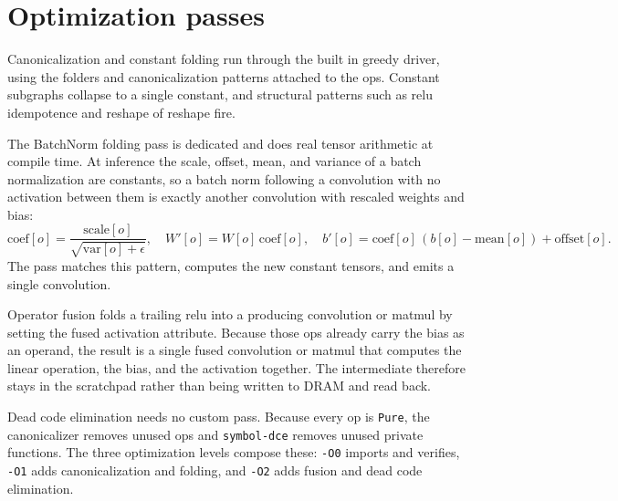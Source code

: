 \section{Optimization passes}

Canonicalization and constant folding run through the built in greedy driver,
using the folders and canonicalization patterns attached to the ops. Constant
subgraphs collapse to a single constant, and structural patterns such as relu
idempotence and reshape of reshape fire.

The BatchNorm folding pass is dedicated and does real tensor arithmetic at compile
time. At inference the scale, offset, mean, and variance of a batch normalization
are constants, so a batch norm following a convolution with no activation between
them is exactly another convolution with rescaled weights and bias:
\[
  \mathrm{coef}[o] = \frac{\mathrm{scale}[o]}{\sqrt{\mathrm{var}[o] + \epsilon}},
  \quad W'[o] = W[o]\,\mathrm{coef}[o],
  \quad b'[o] = \mathrm{coef}[o]\,(b[o] - \mathrm{mean}[o]) + \mathrm{offset}[o].
\]
The pass matches this pattern, computes the new constant tensors, and emits a
single convolution.

Operator fusion folds a trailing relu into a producing convolution or matmul by
setting the fused activation attribute. Because those ops already carry the bias
as an operand, the result is a single fused convolution or matmul that computes
the linear operation, the bias, and the activation together. The intermediate
therefore stays in the scratchpad rather than being written to DRAM and read back.

Dead code elimination needs no custom pass. Because every op is \texttt{Pure}, the
canonicalizer removes unused ops and \texttt{symbol-dce} removes unused private
functions. The three optimization levels compose these: \texttt{-O0} imports and
verifies, \texttt{-O1} adds canonicalization and folding, and \texttt{-O2} adds
fusion and dead code elimination.
